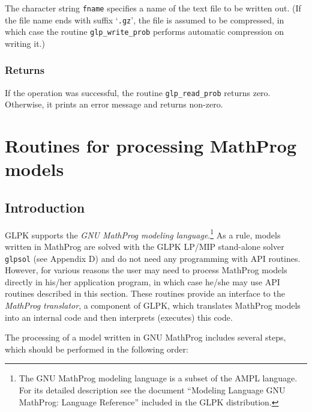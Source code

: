 The character string \verb|fname| specifies a name of the text file to
be written out. (If the file name ends with suffix `\verb|.gz|', the
file is assumed to be compressed, in which case the routine
\verb|glp_write_prob| performs automatic compression on writing it.)

\subsubsection*{Returns}

If the operation was successful, the routine \verb|glp_read_prob|
returns zero. Otherwise, it prints an error message and returns
non-zero.


\newpage

\section{Routines for processing MathProg models}

\subsection{Introduction}

GLPK supports the {\it GNU MathProg modeling language}.\footnote{The
GNU MathProg modeling language is a subset of the AMPL language. For
its detailed description see the document ``Modeling Language GNU
MathProg: Language Reference'' included in the GLPK distribution.}
As a rule, models written in MathProg are solved with the GLPK LP/MIP
stand-alone solver \verb|glpsol| (see Appendix D) and do not need any
programming with API routines. However, for various reasons the user
may need to process MathProg models directly in his/her application
program, in which case he/she may use API routines described in this
section. These routines provide an interface to the {\it MathProg
translator}, a component of GLPK, which translates MathProg models into
an internal code and then interprets (executes) this code.

The processing of a model written in GNU MathProg includes several
steps, which should be performed in the following order:

